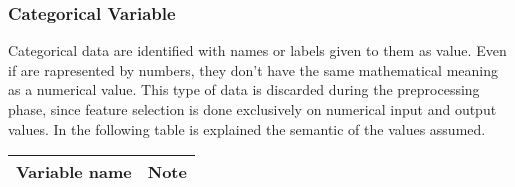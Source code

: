 \subsubsection{Categorical Variable}
Categorical data are identified with names or labels given to them as value. Even if are rapresented by numbers, they don't have the same mathematical meaning as a numerical value. This type of data is discarded during the preprocessing phase, since feature selection is done exclusively on numerical input and output values. 
In the following table is explained the semantic of the values assumed.
\begin{center} 
\setlength{\arrayrulewidth}{1.5pt}
\begin{longtable}{ |p{2.5cm}|p{10cm}| } 
\hline
\textbf{Variable name} & \textbf{Note}\\ 
\hline


\end{longtable}
\end{center}
